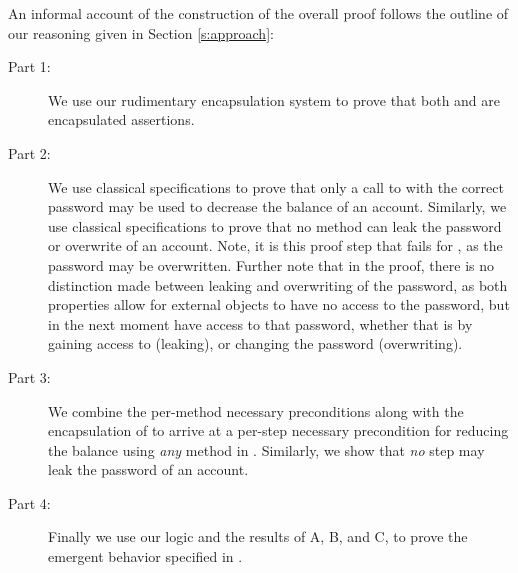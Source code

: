 An informal account of the construction of 
the overall proof follows the outline of our reasoning given in Section \ref{s:approach}:
\begin{description}
\item[Part 1:]
We use our rudimentary encapsulation system to prove that both  and  are encapsulated assertions.
\item[Part 2:]
We use classical specifications to prove that only a call to  
with the correct password may be used to decrease the balance of an account. Similarly, we
use classical specifications to prove that no method can leak the password or overwrite of an account.
Note, it is this proof step that fails for , as the password may be overwritten. Further note that in the 
proof, there is no distinction made between leaking and overwriting of the password, as both properties allow for external 
objects to have no access to the password, but in the next moment have access to that password, whether that is 
by gaining access to (leaking), or changing the password (overwriting).
\item[Part 3:]
We combine the per-method necessary preconditions along with the encapsulation of  to arrive at a per-step
necessary precondition for reducing the balance using \emph{any} method in . Similarly, 
we show that \emph{no} step may leak the password of an account.
\item[Part 4:]
Finally we use our \Nec logic and the results of A, B, and C, to prove the emergent behavior specified in .
\end{description}

